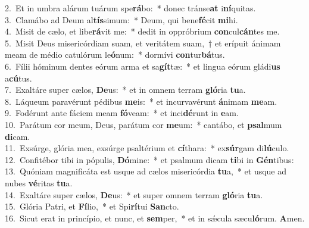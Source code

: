 {2.~}Et in umbra alárum tuárum spe\textbf{rá}bo:~* donec tránse\textbf{at} i\textbf{ní}quitas.\\
{3.~}Clamábo ad Deum al\textbf{tís}simum:~* Deum, qui bene\textbf{fé}cit \textbf{mi}hi.\\
{4.~}Misit de cælo, et libe\textbf{rá}vit me:~* dedit in oppróbrium \textbf{con}cul\textbf{cán}tes me.\\
{5.~}Misit Deus misericórdiam suam, et veritátem suam,~† et erípuit ánimam meam de médio catulórum le\textbf{ó}num:~* dormívi \textbf{con}tur\textbf{bá}tus.\\
{6.~}Fílii hóminum dentes eórum arma et sa\textbf{gít}tæ:~* et lingua eórum gládi\textbf{us} a\textbf{cú}tus.\\
{7.~}Exaltáre super cælos, \textbf{De}us:~* et in omnem terram \textbf{gló}ria \textbf{tu}a.\\
{8.~}Láqueum paravérunt pédibus \textbf{me}is:~* et incurvavérunt \textbf{á}nimam \textbf{me}am.\\
{9.~}Fodérunt ante fáciem meam \textbf{fó}veam:~* et inci\textbf{dé}runt in \textbf{e}am.\\
{10.~}Parátum cor meum, Deus, parátum cor \textbf{me}um:~* cantábo, et \textbf{psal}mum \textbf{di}cam.\\
{11.~}Exsúrge, glória mea, exsúrge psaltérium et \textbf{cí}thara:~* ex\textbf{súr}gam di\textbf{lú}culo.\\
{12.~}Confitébor tibi in pópulis, \textbf{Dó}mine:~* et psalmum dicam \textbf{ti}bi in \textbf{Gén}tibus:\\
{13.~}Quóniam magnificáta est usque ad cælos misericórdia \textbf{tu}a,~* et usque ad nubes \textbf{vé}ritas \textbf{tu}a.\\
{14.~}Exaltáre super cælos, \textbf{De}us:~* et super omnem terram \textbf{gló}ria \textbf{tu}a.\\
{15.~}Glória Patri, et \textbf{Fí}lio,~* et Spi\textbf{rí}tui \textbf{San}cto.\\
{16.~}Sicut erat in princípio, et nunc, et \textbf{sem}per,~* et in sǽcula sæcu\textbf{ló}rum. \textbf{A}men.\\
